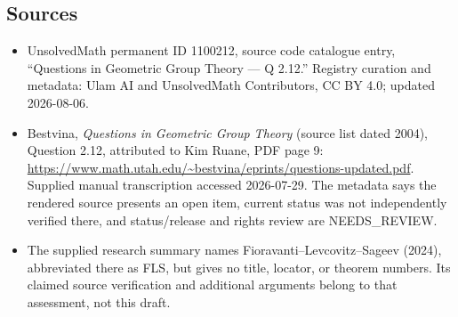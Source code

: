 \documentclass[11pt]{article}
\begin{document}
\subsection{Sources}
\begin{itemize}
\item UnsolvedMath permanent ID 1100212, source code catalogue entry, ``Questions in Geometric Group Theory --- Q 2.12.'' Registry curation and metadata: Ulam AI and UnsolvedMath Contributors, CC BY 4.0; updated 2026-08-06.
\item Bestvina, \emph{Questions in Geometric Group Theory} (source list dated 2004), Question 2.12, attributed to Kim Ruane, PDF page 9: \url{https://www.math.utah.edu/~bestvina/eprints/questions-updated.pdf}. Supplied manual transcription accessed 2026-07-29. The metadata says the rendered source presents an open item, current status was not independently verified there, and status/release and rights review are NEEDS\_REVIEW.
\item The supplied research summary names Fioravanti--Levcovitz--Sageev (2024), abbreviated there as FLS, but gives no title, locator, or theorem numbers. Its claimed source verification and additional arguments belong to that assessment, not this draft.
\end{itemize}
\end{document}
